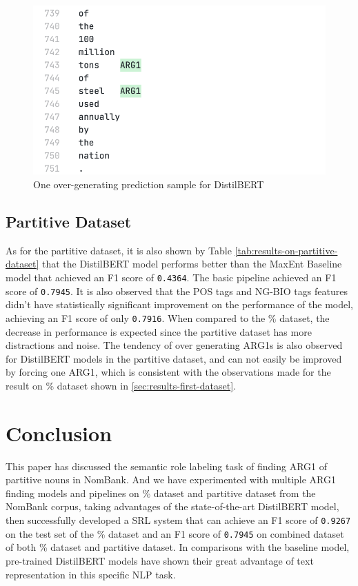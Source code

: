 \documentclass[11pt]{article}
\begin{document}
\begin{figure}[h]
  \centering
  \includegraphics[width=\linewidth]{assets/prediction-one-sample.png}
  \caption{One over-generating prediction sample for DistilBERT}
  \label{fig:prediction-one-sample}
\end{figure}

\subsection{Partitive Dataset}

As for the partitive dataset, it is also shown by Table \ref{tab:results-on-partitive-dataset} that the DistilBERT model performs better than the MaxEnt Baseline model that achieved an F1 score of \verb|0.4364|. The basic pipeline achieved an F1 score of  \verb|0.7945|. It is also observed that the POS tags and NG-BIO tags features didn't have statistically significant improvement on the performance of the model, achieving an F1 score of only \verb|0.7916|. When compared to the \% dataset, the decrease in performance is expected since the partitive dataset has more distractions and noise. The tendency of over generating ARG1s is also observed for DistilBERT models in the partitive dataset, and can not easily be improved by forcing one ARG1, which is consistent with the observations made for the result on \% dataset shown in \ref{sec:results-first-dataset}.

\section{Conclusion}

This paper has discussed the semantic role labeling task of finding ARG1 of partitive nouns in NomBank. And we have experimented with multiple ARG1 finding models and pipelines on \% dataset and partitive dataset from the NomBank corpus, taking advantages of the state-of-the-art DistilBERT model, then successfully developed a SRL system that can achieve an F1 score of \verb|0.9267| on the test set of the \% dataset and an F1 score of \verb|0.7945| on combined dataset of both \% dataset and partitive dataset. In comparisons with the baseline model, pre-trained DistilBERT models have shown their great advantage of text representation in this specific NLP task.
\end{document}
